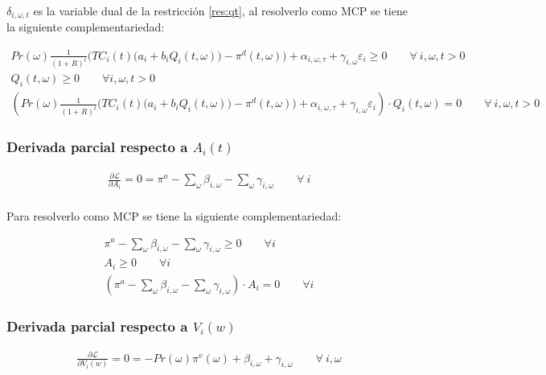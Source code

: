 $\delta_{i,\omega,t}$ es la variable dual de la restricción \ref{res:qt}, al resolverlo como MCP se tiene la siguiente complementariedad:

\begin{footnotesize}
\begin{align}
    Pr(\omega)  \frac{1}{(1+R)^t} \bigg( TC_i(t) \big(a_{i}+b_i Q_i(t,\omega)\big ) -\pi^d(t,\omega) \bigg) + \alpha_{i,\omega,\tau} + \gamma_{i,\omega} \varepsilon_{i} \geq 0 \qquad \forall \ i, \omega, t > 0\\
    Q_i(t,\omega) \geq 0 \qquad  \forall i, \omega, t > 0\\
    (Pr(\omega)  \frac{1}{(1+R)^t} \bigg( TC_i(t) \big(a_{i}+b_i Q_i(t,\omega)\big ) -\pi^d(t,\omega) \bigg) + \alpha_{i,\omega,\tau} + \gamma_{i,\omega} \varepsilon_{i})\cdot  Q_i(t,\omega)= 0 \qquad \forall \ i, \omega, t > 0
\end{align}

\end{footnotesize}


\subsubsection{Derivada parcial respecto a $A_i(t)$}
\begin{footnotesize}
\begin{align}
   \frac{\partial \mathcal{L} }{\partial A_i}= 0
   = \pi^{a} - \sum_{\omega}\beta_{i,\omega} - \sum_{\omega}\gamma_{i,\omega}  \qquad \forall \  i \\
\end{align}

\end{footnotesize}


Para resolverlo como MCP se tiene la siguiente complementariedad:
\begin{footnotesize}
\begin{align}
    \pi^{a} - \sum_{\omega}\beta_{i,\omega} - \sum_{\omega}\gamma_{i,\omega} \geq 0 \qquad \forall  i\\
    A_i \geq 0 \qquad \forall  i\\
    (\pi^{a} - \sum_{\omega}\beta_{i,\omega} - \sum_{\omega}\gamma_{i,\omega}) \cdot A_i = 0 \qquad \forall  i
\end{align}

\end{footnotesize}


\subsubsection{Derivada parcial respecto a $V_i(w)$}
\begin{footnotesize}
\begin{align}
   \frac{\partial \mathcal{L} }{\partial V_i(w)}= 0
   = -Pr(\omega) \pi^v(\omega) + \beta_{i,\omega}  + \gamma_{i,\omega}  \qquad \forall \  i, \omega \\
\end{align}

\end{footnotesize}


